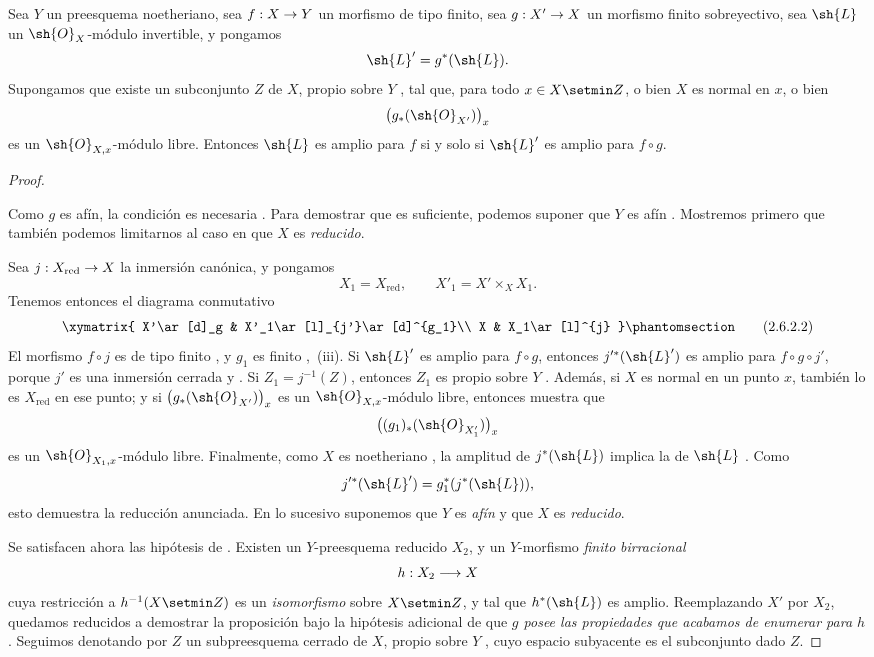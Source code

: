 \documentclass[oneside]{amsart}
\makeatletter
\newcommand{\ega@arrow}[2]{\mathchoice{#1}{#2}{#2}{#2}}
\renewcommand{\to}{\ega@arrow{\longrightarrow}{\rightarrow}}
\let\EGAOriginalLabel\label
\renewcommand{\label}[1]{\phantomsection\EGAOriginalLabel{#1}}
\makeatother
\begin{document}
\begin{proposition}[2.6.2]
\label{III.2.6.2}
Sea $Y$ un preesquema noetheriano, sea $f:X\to Y$ un morfismo de
tipo finito, sea $g:X'\to X$ un morfismo finito sobreyectivo, sea
$\sh{L}$ un $\sh{O}_X$-módulo invertible, y pongamos
\[
  \sh{L}'=g^*(\sh{L}).
\]
Supongamos que existe un subconjunto $Z$ de $X$, propio sobre $Y$
, tal que, para todo $x\in X\setmin Z$, o bien $X$ es
normal en $x$, o bien
\[
  \bigl(g_*(\sh{O}_{X'})\bigr)_x
\]
es un $\sh{O}_{X,x}$-módulo libre.
Entonces $\sh{L}$ es amplio para $f$ si y solo si $\sh{L}'$ es amplio para
$f\circ g$.
\end{proposition}

\begin{proof}
\begin{env}[2.6.2.1]
\label{III.2.6.2.1}
Como $g$ es afín, la condición es necesaria .
Para demostrar que es suficiente, podemos suponer que $Y$ es afín
.
Mostremos primero que también podemos limitarnos al caso en que $X$ es
\emph{reducido}.

Sea $j:X_{\mathrm{red}}\to X$ la inmersión canónica, y pongamos
\[
  X_1=X_{\mathrm{red}},
  \qquad
  X'_1=X'\times_X X_1.
\]
Tenemos entonces el diagrama conmutativo
\[
  \xymatrix{
    X'\ar[d]_g &
    X'_1\ar[l]_{j'}\ar[d]^{g_1}\\
    X &
    X_1\ar[l]^{j}
  }
  \label{III.2.6.2.2}\tag{2.6.2.2}
\]
El morfismo $f\circ j$ es de tipo finito , y
$g_1$ es finito ,~(iii).
Si $\sh{L}'$ es amplio para $f\circ g$, entonces
$j'^*(\sh{L}')$ es amplio para $f\circ g\circ j'$, porque $j'$ es una
inmersión cerrada  y .
Si $Z_1=j^{-1}(Z)$, entonces $Z_1$ es propio sobre $Y$
.
Además, si $X$ es normal en un punto $x$, también lo es $X_{\mathrm{red}}$
en ese punto; y si
$\bigl(g_*(\sh{O}_{X'})\bigr)_x$ es un $\sh{O}_{X,x}$-módulo libre,
entonces  muestra que
\[
  \bigl((g_1)_*(\sh{O}_{X'_1})\bigr)_x
\]
es un $\sh{O}_{X_1,x}$-módulo libre.
Finalmente, como $X$ es noetheriano , la amplitud de
$j^*(\sh{L})$ implica la de $\sh{L}$ .
Como
\[
  j'^*(\sh{L}')=g_1^*(j^*(\sh{L})),
\]
esto demuestra la reducción anunciada.
En lo sucesivo suponemos que $Y$ es \emph{afín} y que $X$ es \emph{reducido}.
\end{env}

Se satisfacen ahora las hipótesis de .
Existen un $Y$-preesquema reducido $X_2$, y un
$Y$-morfismo \emph{finito} \emph{birracional}
\[
  h:X_2\to X
\]
cuya restricción a $h^{-1}(X\setmin Z)$ es un \emph{isomorfismo} sobre $X\setmin Z$, y
tal que $h^*(\sh{L})$ es amplio.
Reemplazando $X'$ por $X_2$, quedamos reducidos a demostrar la proposición bajo
la hipótesis adicional de que \emph{$g$ posee las propiedades que acabamos de enumerar para
$h$}.
Seguimos denotando por $Z$ un subpreesquema cerrado de $X$, propio sobre
$Y$ , cuyo espacio subyacente es el subconjunto dado
$Z$.


\end{proof}
\end{document}
